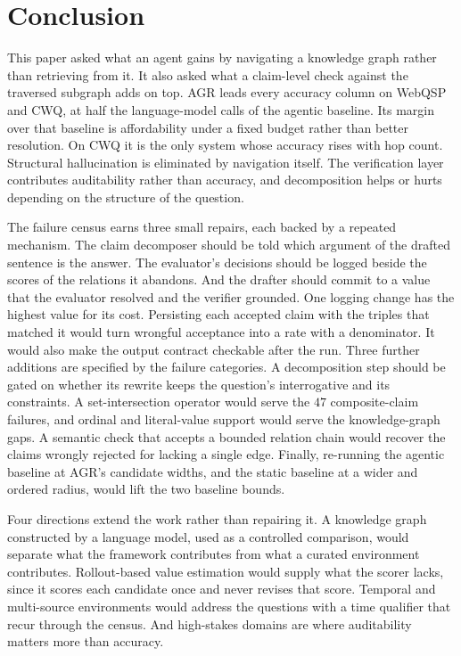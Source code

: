 %
\section{Conclusion}\label{sec:conclusion}

This paper asked what an agent gains by navigating a knowledge graph rather than
retrieving from it. It also asked what a claim-level check against the traversed
subgraph adds on top. AGR leads every accuracy column on WebQSP and CWQ, at half
the language-model calls of the agentic baseline. Its margin over that baseline
is affordability under a fixed budget rather than better resolution. On CWQ it
is the only system whose accuracy rises with hop count. Structural hallucination
is eliminated by navigation itself. The verification layer contributes
auditability rather than accuracy, and decomposition helps or hurts depending on
the structure of the question.

The failure census earns three small repairs, each backed by a repeated
mechanism. The claim decomposer should be told which argument of the drafted
sentence is the answer. The evaluator's decisions should be logged beside the
scores of the relations it abandons. And the drafter should commit to a value
that the evaluator resolved and the verifier grounded. One logging change has
the highest value for its cost. Persisting each accepted claim with the triples
that matched it would turn wrongful acceptance into a rate with a denominator.
It would also make the output contract checkable after the run. Three further
additions are specified by the failure categories. A decomposition step should
be gated on whether its rewrite keeps the question's interrogative and its
constraints. A set-intersection operator would serve the $47$ composite-claim
failures, and ordinal and literal-value support would serve the knowledge-graph
gaps. A semantic check that accepts a bounded relation chain would recover the
claims wrongly rejected for lacking a single edge. Finally, re-running the
agentic baseline at AGR's candidate widths, and the static baseline at a wider
and ordered radius, would lift the two baseline bounds.

Four directions extend the work rather than repairing it. A knowledge graph
constructed by a language model, used as a controlled comparison, would separate
what the framework contributes from what a curated environment contributes.
Rollout-based value estimation would supply what the scorer lacks, since it
scores each candidate once and never revises that score. Temporal and
multi-source environments would address the questions with a time qualifier that
recur through the census. And high-stakes domains are where auditability matters
more than accuracy.


